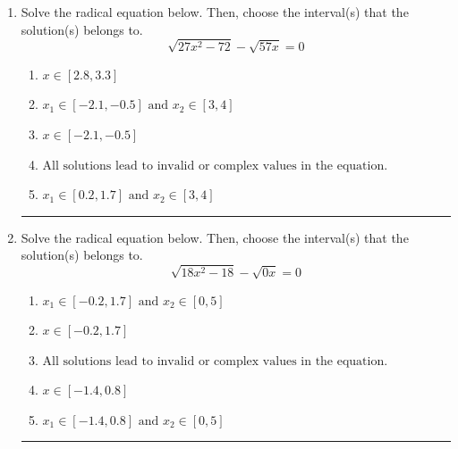 \documentclass[14pt]{extbook}
\newcommand{\litem}[1]{\item#1\hspace*{-1cm}\rule{\textwidth}{0.4pt}}
\begin{document}
\begin{enumerate}
\litem{
Solve the radical equation below. Then, choose the interval(s) that the solution(s) belongs to.\[ \sqrt{27 x^2 - 72} - \sqrt{57 x} = 0 \]\begin{enumerate}[label=\Alph*.]
\item \( x \in [2.8,3.3] \)
\item \( x_1 \in [-2.1, -0.5] \text{ and } x_2 \in [3,4] \)
\item \( x \in [-2.1,-0.5] \)
\item \( \text{All solutions lead to invalid or complex values in the equation.} \)
\item \( x_1 \in [0.2, 1.7] \text{ and } x_2 \in [3,4] \)

\end{enumerate} }
\litem{
Solve the radical equation below. Then, choose the interval(s) that the solution(s) belongs to.\[ \sqrt{18 x^2 - 18} - \sqrt{0 x} = 0 \]\begin{enumerate}[label=\Alph*.]
\item \( x_1 \in [-0.2, 1.7] \text{ and } x_2 \in [0,5] \)
\item \( x \in [-0.2,1.7] \)
\item \( \text{All solutions lead to invalid or complex values in the equation.} \)
\item \( x \in [-1.4,0.8] \)
\item \( x_1 \in [-1.4, 0.8] \text{ and } x_2 \in [0,5] \)


\end{enumerate}}
\end{enumerate}
\end{document}
